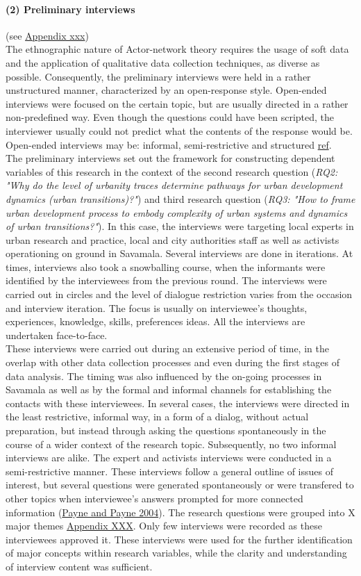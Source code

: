 \documentclass[11pt]{report}
\begin{document}
\paragraph{(2) Preliminary interviews} 
(see \href{}{Appendix xxx})
\\
The ethnographic nature of Actor-network theory requires the usage of soft data and the application of qualitative data collection techniques, as diverse as possible. Consequently, the preliminary interviews were held in a rather unstructured manner, characterized by an open-response style. Open-ended interviews were focused on the certain topic, but are usually directed in a rather non-predefined way. Even though the questions could have been scripted, the interviewer usually could not predict what the contents of the response would be. Open-ended interviews may be: informal, semi-restrictive and structured \href{}{ref}.
\\
The preliminary interviews set out the framework for constructing dependent variables of this research in the context of the second research question (\textit{RQ2: "Why do the level of urbanity traces determine pathways for urban development dynamics (urban transitions)?"}) and third research question (\textit{RQ3: "How to frame urban development process to embody complexity of urban systems and dynamics of urban transitions?"}). In this case, the interviews were targeting local experts in urban research and practice, local and city authorities staff as well as activists operationing on ground in Savamala. Several interviews are done in iterations. At times, interviews also took a snowballing course, when the informants were identified by the interviewees from the previous round. The interviews were carried out in circles and the level of dialogue restriction varies from the occasion and interview iteration. The focus is usually on interviewee's thoughts, experiences, knowledge, skills, preferences ideas. All the interviews are undertaken face-to-face.
\\
These interviews were carried out during an extensive period of time, in the overlap with other data collection processes and even during the first stages of data analysis. The timing was also influenced by the on-going processes in Savamala as well as by the formal and informal channels for establishing the contacts with these interviewees. In several cases, the interviews were directed in the least restrictive, informal way, in a form of a dialog, without actual preparation, but instead through asking the questions spontaneously in the course of a wider context of the research topic. Subsequently, no two informal interviews are alike. The expert and activists interviews were conducted in a semi-restrictive manner. These interviews follow a general outline of issues of interest, but several questions were generated spontaneously or were transfered to other topics when interviewee's answers prompted for more connected information (\href{}{Payne and Payne 2004}). The research questions were grouped into X major themes \href{}{Appendix XXX}. Only few interviews were recorded as these interviewees approved it. These interviews were used for the further identification of major concepts within research variables, while the clarity and understanding of interview content was sufficient. 
\end{document}
